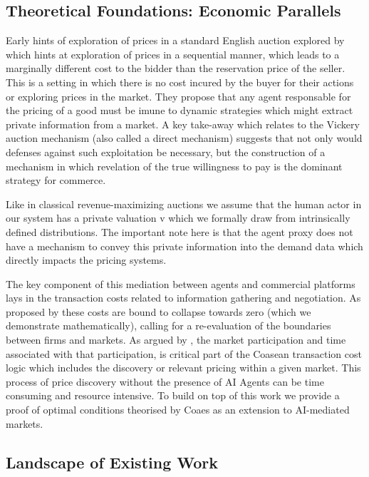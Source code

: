 \subsection{Theoretical Foundations: Economic Parallels}

Early hints of exploration of prices in a standard English auction explored by \textcite{varian_economic_1995} which hints at exploration of prices in a sequential manner, which leads to a marginally different cost to the bidder than the reservation price of the seller. This is a setting in which there is no cost incured by the buyer for their actions or exploring prices in the market. They propose that any agent responsable for the pricing of a good must be imune to dynamic strategies which might extract private information from a market. A key take-away which relates to the Vickery auction mechanism (also called a direct mechanism) suggests that not only would defenses against such exploitation be necessary, but the construction of a mechanism in which revelation of the true willingness to pay is the dominant strategy for commerce.

Like in classical revenue-maximizing auctions \parencite{roughgarden_cs364a_2013} we assume that the human actor in our system has a private valuation v which we formally draw from intrinsically defined distributions. The important note here is that the agent proxy does not have a mechanism to convey this private information into the demand data which directly impacts the pricing systems.

The key component of this mediation between agents and commercial platforms lays in the transaction costs related to information gathering and negotiation. As proposed by \textcite{shahidi_coasean_2025} these costs are bound to collapse towards zero (which we demonstrate mathematically), calling for a re-evaluation of the boundaries between firms and markets. As argued by \textcite{coase_nature_1937}, the market participation and time associated with that participation, is critical part of the Coasean transaction cost logic which includes the discovery or relevant pricing within a given market. This process of price discovery without the presence of AI Agents can be time consuming and resource intensive. To build on top of this work we provide a proof of optimal conditions theorised by Coaes as an extension to AI-mediated markets.

\subsection{Landscape of Existing Work}

